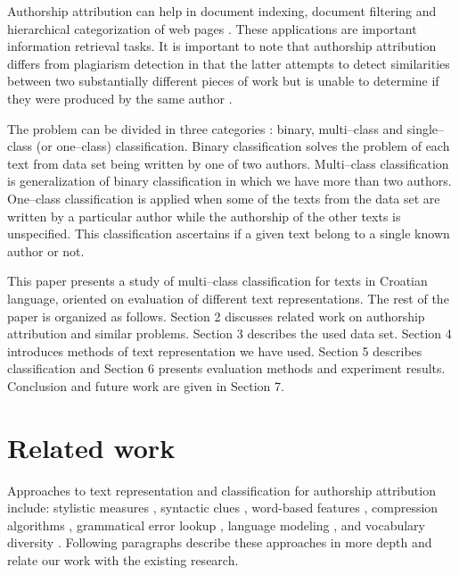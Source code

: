 \documentclass[11pt,english]{article}
\begin{document}
\begin{multicols}{2}
Authorship attribution can help in document indexing, document filtering and
hierarchical categorization of web pages \citep{luyckx2005shallow}. These
applications are important information retrieval tasks. It is important to note
that authorship attribution differs from plagiarism detection in that the latter
attempts to detect similarities between two substantially different pieces of
work but is unable to determine if they were produced by the same author
\citep{de2001mining}.

The problem can be divided in three categories \citep{zhao2005effective}: binary,
multi--class and single--class (or one--class) classification. Binary
classification solves the problem of each text from data set being written by one
of two authors. Multi--class classification is generalization of binary
classification in which we have more than two authors. One--class classification
is applied when some of the texts from the data set are written by a particular
author while the authorship of the other texts is unspecified. This
classification ascertains if a given text belong to a single known author or not.

This paper presents a study of multi--class classification for texts in Croatian
language, oriented on evaluation of different text representations. The rest of
the paper is organized as follows. Section 2 discusses related work on authorship
attribution and similar problems. Section 3 describes the used data set. Section
4 introduces methods of text representation we have used. Section 5 describes
classification and Section 6 presents evaluation methods and experiment results.
Conclusion and future work are given in Section 7.

\section{Related work}
Approaches to text representation and classification for authorship attribution
include: stylistic measures \citep{coyotl2006authorship}, syntactic clues
\citep{stamatatos2001computer,uzuner2005comparative}, word-based features
\citep{argamon2005measuring,uzuner2005comparative}, compression algorithms
\citep{kukushkina2001using,zhao2005effective}, grammatical error lookup
\citep{koppel2003exploiting}, language modeling
\citep{peng2003language,coyotl2006authorship}, and vocabulary diversity
\citep{stamatatos2001computer}. Following paragraphs describe these approaches in
more depth and relate our work with the existing research.


\end{multicols}
\end{document}
